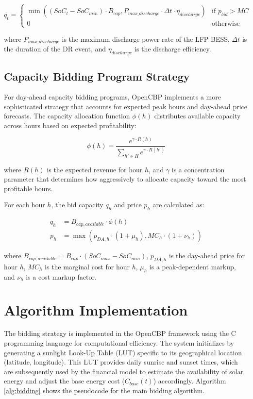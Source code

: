 \documentclass[11pt,a4paper]{article}
\begin{document}
\begin{equation}
q_t = \begin{cases}
\min((SoC_t - SoC_{min}) \cdot B_{cap}, P_{max\_discharge} \cdot \Delta t \cdot \eta_{discharge}) & \text{if } p_{bid} > MC \\
0 & \text{otherwise}
\end{cases}
\end{equation}

where $P_{max\_discharge}$ is the maximum discharge power rate of the LFP BESS, $\Delta t$ is the duration of the DR event, and $\eta_{discharge}$ is the discharge efficiency.

\subsection{Capacity Bidding Program Strategy}
For day-ahead capacity bidding programs, OpenCBP implements a more sophisticated strategy that accounts for expected peak hours and day-ahead price forecasts. The capacity allocation function $\phi(h)$ distributes available capacity across hours based on expected profitability:

\begin{equation}
\phi(h) = \frac{e^{\gamma \cdot R(h)}}{\sum_{h' \in H} e^{\gamma \cdot R(h')}}
\end{equation}

where $R(h)$ is the expected revenue for hour $h$, and $\gamma$ is a concentration parameter that determines how aggressively to allocate capacity toward the most profitable hours.

For each hour $h$, the bid capacity $q_h$ and price $p_h$ are calculated as:

\begin{align}
q_h &= B_{cap,available} \cdot \phi(h) \\
p_h &= \max(p_{DA,h} \cdot (1 + \mu_h), MC_h \cdot (1 + \nu_h))
\end{align}

where $B_{cap,available} = B_{cap} \cdot (SoC_{max} - SoC_{min})$, $p_{DA,h}$ is the day-ahead price for hour $h$, $MC_h$ is the marginal cost for hour $h$, $\mu_h$ is a peak-dependent markup, and $\nu_h$ is a cost markup factor.

\section{Algorithm Implementation} \label{sec:AlgorithmImplementation}
The bidding strategy is implemented in the OpenCBP framework using the C programming language for computational efficiency. The system initializes by generating a sunlight Look-Up Table (LUT) specific to its geographical location (latitude, longitude). This LUT provides daily sunrise and sunset times, which are subsequently used by the financial model to estimate the availability of solar energy and adjust the base energy cost ($C_{base}(t)$) accordingly. Algorithm \ref{alg:bidding} shows the pseudocode for the main bidding algorithm.
\end{document}
